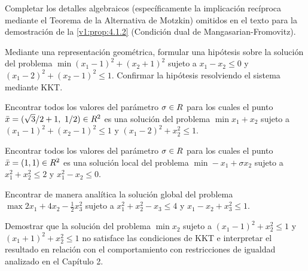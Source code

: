 


\begin{exercise}\label{v1:ejer:4.2.1}
 Completar los detalles algebraicos (específicamente la implicación recíproca mediante el Teorema de la Alternativa de Motzkin) omitidos en el texto para la demostración de la \cref{v1:prop:4.1.2} (Condición dual de Mangasarian-Fromovitz).
\end{exercise}

\begin{exercise}\label{v1:ejer:4.2.2}
 Mediante una representación geométrica, formular una hipótesis sobre la solución del problema $\min (x_1 - 1)^2 + (x_2 + 1)^2$ sujeto a $x_1 - x_2 \leq 0$ y $(x_1 - 2)^2 + (x_2 - 1)^2 \leq 1$. Confirmar la hipótesis resolviendo el sistema mediante KKT.
\end{exercise}

\begin{exercise}\label{v1:ejer:4.2.3}
 Encontrar todos los valores del parámetro $\sigma \in R$ para los cuales el punto $\bar{x} = (\sqrt{3}/2 + 1, \ 1/2) \in R^2$ es una solución del problema $\min x_1 + x_2$ sujeto a $(x_1 - 1)^2 + (x_2 - 1)^2 \leq 1$ y $(x_1 - 2)^2 + x_2^2 \leq 1$.
\end{exercise}

\begin{exercise}\label{v1:ejer:4.2.4}
 Encontrar todos los valores del parámetro $\sigma \in R$ para los cuales el punto $\bar{x} = (1, 1) \in R^2$ es una solución local del problema $\min -x_1 + \sigma x_2$ sujeto a $x_1^2 + x_2^2 \le 2$ y $x_1^2 - x_2 \le 0$.
\end{exercise}

\begin{exercise}\label{v1:ejer:4.2.5}
 Encontrar de manera analítica la solución global del problema $\max 2x_1 + 4x_2 - \frac{1}{2} x_3^2$ sujeto a $x_1^2 + x_2^2 - x_3 \le 4$ y $x_1 - x_2 + x_3^2 \le 1$.
\end{exercise}

\begin{exercise}\label{v1:ejer:4.2.6}
 Demostrar que la solución del problema $\min x_2$ sujeto a $(x_1 - 1)^2 + x_2^2 \le 1$ y $(x_1 + 1)^2 + x_2^2 \le 1$ no satisface las condiciones de KKT e interpretar el resultado en relación con el comportamiento con restricciones de igualdad analizado en el Capítulo 2.
\end{exercise}

